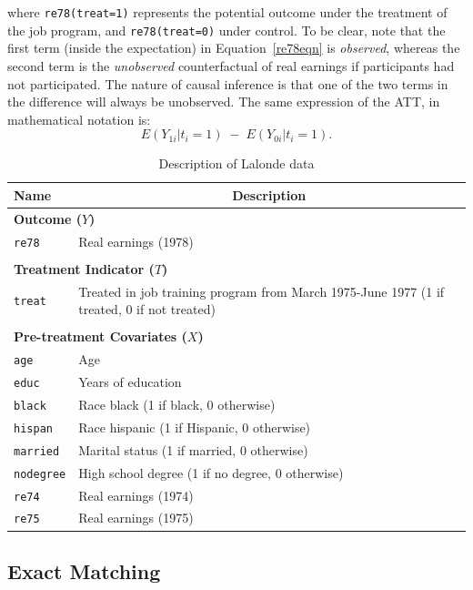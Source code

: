 \documentclass[oneside,letterpaper,titlepage]{article}
\begin{document}
\noindent where \texttt{re78(treat=1)} represents the potential
outcome under the treatment of the job program, and
\texttt{re78(treat=0)} under control.  To be clear, note that the
first term (inside the expectation) in Equation~\ref{re78eqn} is
\emph{observed}, whereas the second term is the \emph{unobserved}
counterfactual of real earnings if participants had not participated.
The nature of causal inference is that one of the two terms in the
difference will always be unobserved.  The same expression of the ATT,
in mathematical notation is:
\begin{equation}
  E(Y_{1i} | t_i=1 ) \; - \; E(Y_{0i} | t_i=1).
\end{equation}
\begin{table}[h]
\centering
\begin{tabular}{lp{3in}}
  \hline 
  \multicolumn{1}{l}{Name} & \multicolumn{1}{c}{Description} \\
  \hline
  \multicolumn{2}{l}{\textbf{Outcome ($Y$)}} \\ 
  \texttt{re78} & Real earnings (1978) \\\\
  \multicolumn{2}{l}{\textbf{Treatment Indicator ($T$)}} \\
  \texttt{treat} & Treated in job training program from March 1975-June
  1977 (1 if treated, 0 if not treated)
  \\ \\
  \multicolumn{2}{l}{\textbf{Pre-treatment Covariates ($X$)}} \\
  \texttt{age} & Age\\
  \texttt{educ} & Years of education \\
  \texttt{black} & Race black (1 if black, 0 otherwise) \\
  \texttt{hispan} & Race hispanic  (1 if Hispanic, 0 otherwise) \\
  \texttt{married} & Marital status (1 if married, 0 otherwise) \\
  \texttt{nodegree} & High school degree (1 if no degree, 0 otherwise)\\
  \texttt{re74} & Real earnings (1974) \\
  \texttt{re75} & Real earnings (1975) \\ 
  \hline
\end{tabular}\label{lalonde}
\caption{Description of Lalonde data \label{dwvars}}
\end{table}

\subsection{Exact Matching} 
\label{exactm}
\end{document}
